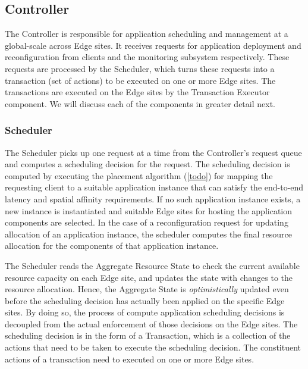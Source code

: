 \subsection{Controller}
The Controller is responsible for application scheduling and management at a global-scale across Edge sites. It receives requests for application deployment and reconfiguration from clients and the monitoring subsystem respectively. These requests are processed by the Scheduler, which turns these requests into a transaction (set of actions) to be executed on one or more Edge sites. The transactions are executed on the Edge sites by the Transaction Executor component. We will discuss each of the components in greater detail next.
\subsubsection{Scheduler}
\label{sec:scheduler}
The Scheduler picks up one request at a time from the Controller's request queue and computes a scheduling decision for the request. The scheduling decision is computed by executing the placement algorithm (\cref{todo}) for mapping the requesting client to a suitable application instance that can satisfy the end-to-end latency and spatial affinity requirements. If no such application instance exists, a new instance is instantiated and suitable Edge sites for hosting the application components are selected. In the case of a reconfiguration request for updating allocation of an application instance, the scheduler computes the final resource allocation for the components of that application instance.
\par The Scheduler reads the Aggregate Resource State to check the current available resource capacity on each Edge site, and updates the state with changes to the resource allocation. Hence, the Aggregate State is \textit{optimistically} updated even before the scheduling decision has actually been applied on the specific Edge sites. By doing so, the process of compute application scheduling decisions is decoupled from the actual enforcement of those decisions on the Edge sites. The scheduling decision is in the form of a Transaction, which is a collection of the actions that need to be taken to execute the scheduling decision. The constituent actions of a transaction need to executed on one or more Edge sites. 

